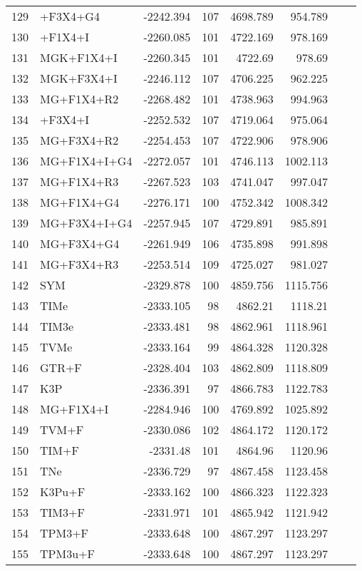 \begin{longtable}{clrrrrrr}
	129 & \gy+F3X4+G4 & -2242.394 & 107 & 4698.789 & 954.789 \\ 
	130 & \gy+F1X4+I & -2260.085 & 101 & 4722.169 & 978.169 \\ 
	131 & MGK+F1X4+I & -2260.345 & 101 & 4722.69 & 978.69 \\ 
	132 & MGK+F3X4+I & -2246.112 & 107 & 4706.225 & 962.225 \\ 
	133 & MG+F1X4+R2 & -2268.482 & 101 & 4738.963 & 994.963 \\ 
	134 & \gy+F3X4+I & -2252.532 & 107 & 4719.064 & 975.064 \\ 
	135 & MG+F3X4+R2 & -2254.453 & 107 & 4722.906 & 978.906 \\ 
	136 & MG+F1X4+I+G4 & -2272.057 & 101 & 4746.113 & 1002.113 \\ 
	137 & MG+F1X4+R3 & -2267.523 & 103 & 4741.047 & 997.047 \\ 
	138 & MG+F1X4+G4 & -2276.171 & 100 & 4752.342 & 1008.342 \\ 
	139 & MG+F3X4+I+G4 & -2257.945 & 107 & 4729.891 & 985.891 \\ 
	140 & MG+F3X4+G4 & -2261.949 & 106 & 4735.898 & 991.898 \\ 
	141 & MG+F3X4+R3 & -2253.514 & 109 & 4725.027 & 981.027 \\ 
	142 & SYM & -2329.878 & 100 & 4859.756 & 1115.756 \\ 
	143 & TIMe & -2333.105 & 98 & 4862.21 & 1118.21 \\ 
	144 & TIM3e & -2333.481 & 98 & 4862.961 & 1118.961 \\ 
	145 & TVMe & -2333.164 & 99 & 4864.328 & 1120.328 \\ 
	146 & GTR+F & -2328.404 & 103 & 4862.809 & 1118.809 \\ 
	147 & K3P & -2336.391 & 97 & 4866.783 & 1122.783 \\ 
	148 & MG+F1X4+I & -2284.946 & 100 & 4769.892 & 1025.892 \\ 
	149 & TVM+F & -2330.086 & 102 & 4864.172 & 1120.172 \\ 
	150 & TIM+F & -2331.48 & 101 & 4864.96 & 1120.96 \\ 
	151 & TNe & -2336.729 & 97 & 4867.458 & 1123.458 \\ 
	152 & K3Pu+F & -2333.162 & 100 & 4866.323 & 1122.323 \\ 
	153 & TIM3+F & -2331.971 & 101 & 4865.942 & 1121.942 \\ 
	154 & TPM3+F & -2333.648 & 100 & 4867.297 & 1123.297 \\ 
	155 & TPM3u+F & -2333.648 & 100 & 4867.297 & 1123.297 \\ 

\end{longtable}
